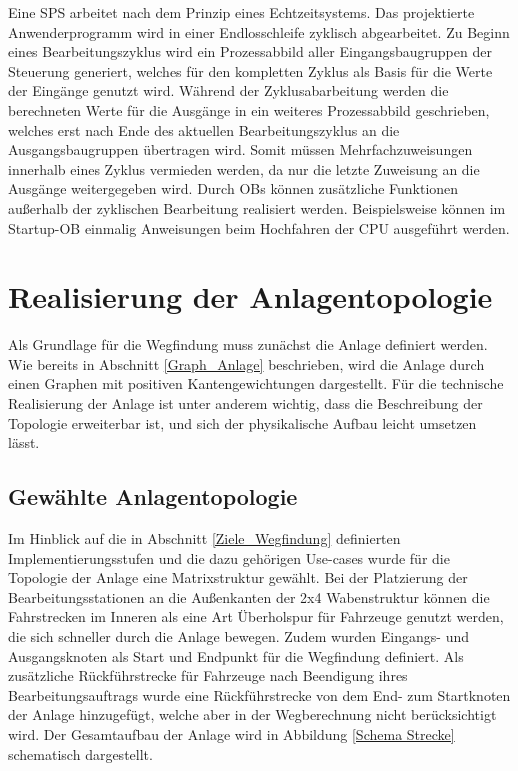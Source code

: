 			Eine \acl{SPS} arbeitet nach dem Prinzip eines Echtzeitsystems. Das projektierte Anwenderprogramm wird in einer Endlosschleife zyklisch abgearbeitet. Zu Beginn eines Bearbeitungszyklus wird ein Prozessabbild aller Eingangsbaugruppen  der Steuerung generiert, welches für den kompletten Zyklus als Basis für die Werte der Eingänge genutzt wird. Während der Zyklusabarbeitung werden die berechneten Werte für die Ausgänge in ein weiteres Prozessabbild geschrieben, welches erst nach Ende des aktuellen Bearbeitungszyklus an die Ausgangsbaugruppen übertragen wird. Somit müssen Mehrfachzuweisungen innerhalb eines Zyklus vermieden werden, da nur die letzte Zuweisung an die Ausgänge weitergegeben wird. Durch \ac{OB}s können zusätzliche Funktionen außerhalb der zyklischen Bearbeitung realisiert werden. Beispielsweise können im Startup-\ac{OB} einmalig Anweisungen beim Hochfahren der CPU ausgeführt werden.
	
	\section{Realisierung der Anlagentopologie}
		
		Als Grundlage für die Wegfindung muss zunächst die Anlage definiert werden. Wie bereits in Abschnitt \ref{Graph_Anlage} beschrieben, wird die Anlage durch einen Graphen mit positiven Kantengewichtungen dargestellt. Für die technische Realisierung der Anlage ist unter anderem wichtig, dass die Beschreibung der Topologie erweiterbar ist, und sich der physikalische Aufbau leicht umsetzen lässt.
		
		\subsection{Gewählte Anlagentopologie}
			
			Im Hinblick auf die in Abschnitt \ref{Ziele_Wegfindung} definierten Implementierungsstufen und die dazu gehörigen Use-cases wurde für die Topologie der Anlage eine Matrixstruktur gewählt.  Bei der Platzierung der Bearbeitungsstationen an die Außenkanten der 2x4 Wabenstruktur können die Fahrstrecken im Inneren als eine Art Überholspur für Fahrzeuge genutzt werden, die sich schneller durch die Anlage bewegen. Zudem wurden Eingangs- und Ausgangsknoten als Start und Endpunkt für die Wegfindung definiert. Als zusätzliche Rückführstrecke für Fahrzeuge nach Beendigung ihres Bearbeitungsauftrags wurde eine Rückführstrecke von dem End- zum Startknoten der Anlage hinzugefügt, welche aber in der Wegberechnung nicht berücksichtigt wird. Der Gesamtaufbau der Anlage wird in Abbildung \ref{Schema Strecke} schematisch dargestellt.
			
